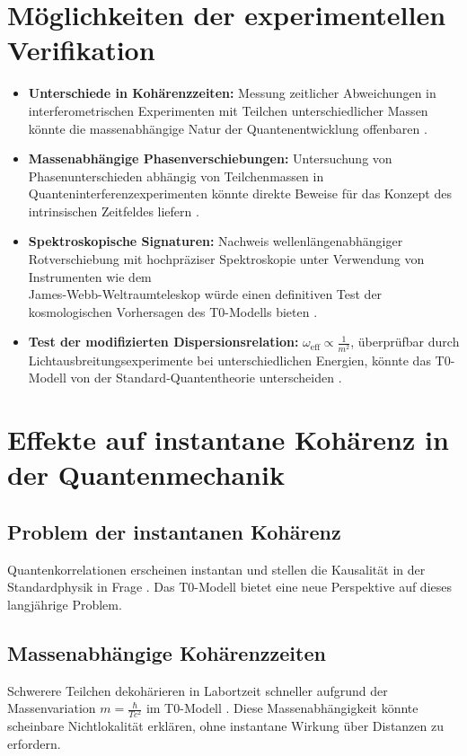 \documentclass[12pt,a4paper]{article}
\begin{document}
	\section{Möglichkeiten der experimentellen Verifikation}
	\begin{itemize}
		\item \textbf{Unterschiede in Kohärenzzeiten:} Messung zeitlicher Abweichungen in interferometrischen Experimenten mit Teilchen unterschiedlicher Massen könnte die massenabhängige Natur der Quantenentwicklung offenbaren \cite{pascher_erweiterung_2025}.
		
		\item \textbf{Massenabhängige Phasenverschiebungen:} Untersuchung von Phasenunterschieden abhängig von Teilchenmassen in Quanteninterferenzexperimenten könnte direkte Beweise für das Konzept des intrinsischen Zeitfeldes liefern \cite{pascher_feldtheorie_2025}.
		
		\item \textbf{Spektroskopische Signaturen:} Nachweis wellenlängenabhängiger Rotverschiebung mit hochpräziser Spektroskopie unter Verwendung von Instrumenten wie dem \\James-Webb-Weltraumteleskop würde einen definitiven Test der kosmologischen Vorhersagen des T0-Modells bieten \cite{pascher_messdifferenzen_2025}.
		
		\item \textbf{Test der modifizierten Dispersionsrelation:} \( \omega_{\text{eff}} \propto \frac{1}{m^2} \), überprüfbar durch Lichtausbreitungsexperimente bei unterschiedlichen Energien, könnte das T0-Modell von der Standard-Quantentheorie unterscheiden \cite{pascher_photons_2025}.
	\end{itemize}
	
	\section{Effekte auf instantane Kohärenz in der Quantenmechanik}
	\subsection{Problem der instantanen Kohärenz}
	Quantenkorrelationen erscheinen instantan und stellen die Kausalität in der Standardphysik in Frage \cite{bell}. Das T0-Modell bietet eine neue Perspektive auf dieses langjährige Problem.
	
	\subsection{Massenabhängige Kohärenzzeiten}
	Schwerere Teilchen dekohärieren in Labortzeit schneller aufgrund der Massenvariation \( m = \frac{\hbar}{T c^2} \) im T0-Modell \cite{pascher_galaxies_2025, pascher_feldtheorie_2025}. Diese Massenabhängigkeit könnte scheinbare Nichtlokalität erklären, ohne instantane Wirkung über Distanzen zu erfordern.
	
\end{document}
